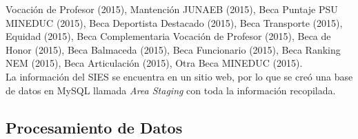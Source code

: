 Vocación de Profesor (2015), Mantención JUNAEB (2015), Beca Puntaje PSU MINEDUC (2015), Beca Deportista Destacado (2015), Beca Transporte (2015), Equidad (2015), Beca Complementaria Vocación de Profesor (2015), Beca de Honor (2015), Beca Balmaceda (2015), Beca Funcionario (2015), Beca Ranking NEM (2015), Beca Articulación (2015), Otra Beca MINEDUC (2015).\\

La información del SIES se encuentra en un sitio web, por lo que se creó una base de datos en MySQL llamada \textit{Area Staging} con toda la información recopilada.\\


\subsection{Procesamiento de Datos}

